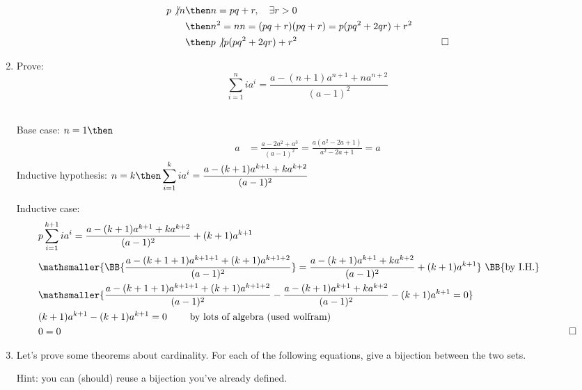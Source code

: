 \documentclass[basic, header]{nosvagor-notes}
\begin{document}
\begin{enumerate}[itemsep=4em]
    \begin{align*}
      p \not| n &\then n = pq + r, \quad \exists r > 0 \\
                &\then n^2 = nn = (pq+r)(pq+r) = p(pq^2 + 2qr) + r^2\\
                &\then p \not| p(pq^2 + 2qr) + r^2 & \qed \\
    \end{align*}

  \newpage %

  \item Prove:
    \[%
      \sum_{i=1}^{n} ia^i = \frac{a-(n+1)a^{n+1} + na^{n+2}}{(a-1)^2}
    \]%

    \\
    Base case: \(n = 1 \then\)
    \begin{align*}
     a &= \frac{a - 2a^2 + a^3}{(a-1)^2} = \frac{a(a^2 - 2a + 1)}{a^2 - 2a + 1} = a
    \end{align*}
    Inductive hypothesis: \(\displaystyle
    n=k
    \then
      \sum_{i=1}^{k} ia^i = \frac{a-(k+1)a^{k+1} + ka^{k+2}}{(a-1)^2}
     \)

    Inductive case:
    \begin{align*}
      &p\sum_{i=1}^{k+1} ia^i = \frac{a-(k+1)a^{k+1} + ka^{k+2}}{(a-1)^2} + (k+1)a^{k+1}\\
      &\mathsmaller{\BB{\frac{a-(k+1+1)a^{k+1+1} + (k+1)a^{k+1+2}}{(a-1)^2}} =
      \frac{a-(k+1)a^{k+1} + ka^{k+2}}{(a-1)^2} + (k+1)a^{k+1}}
      ~\text{\BB{by I.H.}} \\
      &\mathsmaller{\frac{a-(k+1+1)a^{k+1+1} + (k+1)a^{k+1+2}}{(a-1)^2} -
      \frac{a-(k+1)a^{k+1} + ka^{k+2}}{(a-1)^2} - (k+1)a^{k+1} = 0}\\
      &(k+1)a^{k+1}  - (k+1)a^{k+1} = 0 \qquad~\text{by lots of algebra (used wolfram)}\\
      &0 = 0 & \qed
    \end{align*}

  \item Let’s prove some theorems about cardinality. For each of the following
    equations, give a bijection between the two sets.

    Hint: you can (should) reuse a bijection you've already defined.
    \begin{enumerate}[leftmargin=2em]


\end{enumerate}
\end{enumerate}
\end{document}
